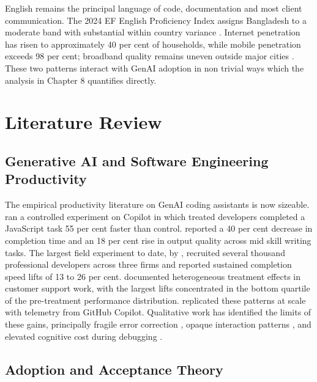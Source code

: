 \documentclass[11pt,a4paper]{report}
\begin{document}
English remains the principal language of code, documentation and most
client communication. The 2024 EF English Proficiency Index assigns
Bangladesh to a moderate band with substantial within country variance
\citep{EFEPI2024}. Internet penetration has risen to approximately
40 per cent of households, while mobile penetration exceeds 98 per cent;
broadband quality remains uneven outside major cities
\citep{ITUDigitalDevelopment2025}. These two patterns interact with
GenAI adoption in non trivial ways which the analysis in Chapter 8
quantifies directly.

\chapter{Literature Review}

\section{Generative AI and Software Engineering Productivity}

The empirical productivity literature on GenAI coding assistants is now
sizeable. \citet{PengKalliamvakouEtAl2023} ran a controlled experiment
on Copilot in which treated developers completed a JavaScript task
55 per cent faster than control. \citet{NoyZhang2023} reported a
40 per cent decrease in completion time and an 18 per cent rise in
output quality across mid skill writing tasks. The largest field
experiment to date, by \citet{CuiDemirerEtAl2025}, recruited several
thousand professional developers across three firms and reported
sustained completion speed lifts of 13 to 26 per cent.
\citet{BrynjolfssonLiRaymond2025} documented heterogeneous treatment
effects in customer support work, with the largest lifts concentrated
in the bottom quartile of the pre-treatment performance distribution.
\citet{ZieglerEtAl2024} replicated these patterns at scale with
telemetry from GitHub Copilot. Qualitative work has identified the
limits of these
gains, principally fragile error correction
\citep{Vaithilingam2022,LiangYangMyers2024}, opaque interaction patterns
\citep{BarkeJamesPolikarpova2023}, and elevated cognitive cost during
debugging \citep{MozannarEtAl2024}.

\section{Adoption and Acceptance Theory}
\end{document}

